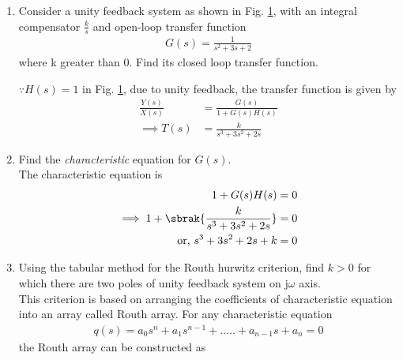 \begin{enumerate}[label=\thesubsection.\arabic*.,ref=\thesubsection.\theenumi]

\item
Consider a unity feedback system as shown in Fig.  \ref{fig:ee18btech11005}, with an integral compensator $\frac{k}{s}$ and open-loop transfer function
\begin{align}
G(s) = \frac{1}{s^2+3s+2}
\end{align}
where k greater than 0. 
%
Find its closed loop transfer function.
\begin{figure}[!ht]
	\begin{center}
		
		\resizebox{\columnwidth}{!}{}
	\end{center}
\caption{}
\label{fig:ee18btech11005}
\end{figure}

\solution $\because H(s) = 1$ in Fig.  \ref{fig:ee18btech11005}, due to unity feedback,   the transfer function is given by
\begin{align}
\frac{Y(s)}{X(s)} &= \frac{G(s)}{1+G(s)H(s)}
\\
\implies T(s) &= \frac{k}{s^3+3s^2+2s}
\end{align}
%
\item Find the {\em characteristic} equation for $G(s)$.
\\
\solution The characteristic equation is
\begin{align}
\label{eq:routh_char_eq}
 1 + G(s)H(s) &= 0 
\\
\implies 1 + \sbrak{\frac{k}{s^3+3s^2+2s}} &= 0
\\
\text{or, } s^3+3s^2+2s+k &= 0
\end{align}
\item Using the tabular method for the Routh hurwitz criterion, find $k > 0$ for which there are two poles of unity feedback system on j${\omega}$ axis.
%
\\
\solution 
This criterion is based on arranging the coefficients of characteristic equation into an array called Routh array.
For any characteristic equation 
\begin{multline}
q(s) = a_0s^n+a_1s^{n-1}+.....+a_{n-1}s+a_n = 0
\end{multline}
the Routh array can be constructed as 
 

\end{enumerate}
